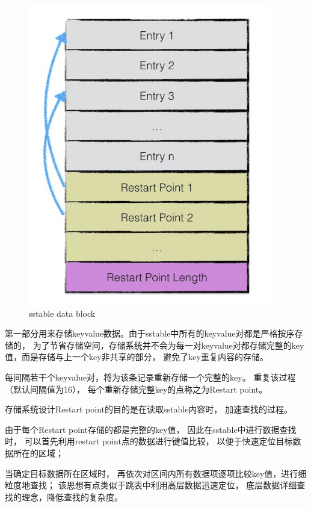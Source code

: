 \begin{enumerate}
\begin{enumerate}
					\begin{figure}[H]
						\centering
						\includegraphics[width=0.95\textwidth]{images/datablock.jpeg}
						\caption{sstable data block}
						\label{sstable_data_block}
					\end{figure}
					
					第一部分用来存储keyvalue数据。由于sstable中所有的keyvalue对都是严格按序存储的，
					为了节省存储空间，存储系统并不会为每一对keyvalue对都存储完整的key值，而是存储与上一个key非共享的部分，
					避免了key重复内容的存储。
	
					每间隔若干个keyvalue对，将为该条记录重新存储一个完整的key。
					重复该过程（默认间隔值为16），
					每个重新存储完整key的点称之为Restart point。
	
					存储系统设计Restart point的目的是在读取sstable内容时，
					加速查找的过程。
	
					由于每个Restart point存储的都是完整的key值，
					因此在sstable中进行数据查找时，
					可以首先利用restart point点的数据进行键值比较，
					以便于快速定位目标数据所在的区域；
	
					当确定目标数据所在区域时，
					再依次对区间内所有数据项逐项比较key值，进行细粒度地查找；
					该思想有点类似于跳表中利用高层数据迅速定位，
					底层数据详细查找的理念，降低查找的复杂度。
	

\end{enumerate}
\end{enumerate}
